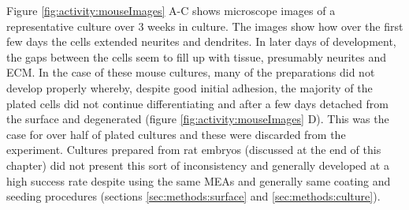     Figure \ref{fig:activity:mouseImages} A-C shows microscope images of a representative culture over 3 weeks in culture. The images show how over the first few days the cells extended neurites and dendrites. In later days of development, the gaps between the cells seem to fill up with tissue, presumably neurites and ECM. In the case of these mouse cultures, many of the preparations did not develop properly whereby, despite good initial adhesion, the majority of the plated cells did not continue differentiating and after a few days detached from the surface and degenerated (figure \ref{fig:activity:mouseImages} D). This was the case for over half of plated cultures and these were discarded from the experiment. Cultures prepared from rat embryos (discussed at the end of this chapter) did not present this sort of inconsistency and generally developed at a high success rate despite using the same MEAs and generally same coating and seeding procedures (sections \ref{sec:methods:surface} and \ref{sec:methods:culture}).
